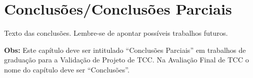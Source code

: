 \chapter{Conclusões/Conclusões Parciais}
\label{cap:05}

Texto das conclusões. Lembre-se de apontar possíveis trabalhos futuros.

\textbf{Obs:} Este capítulo deve ser intitulado ``Conclusões Parciais'' em trabalhos de graduação para a Validação de Projeto de TCC. Na Avaliação Final de TCC o nome do capítulo deve ser ``Conclusões''.
